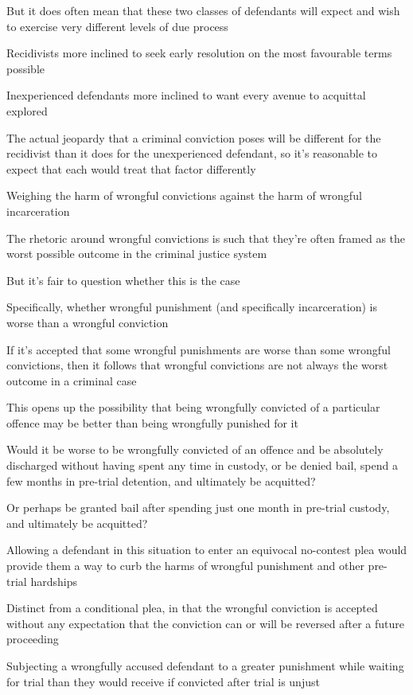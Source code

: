 But it does often mean that these two classes of defendants will expect and wish to exercise very different levels of due process

Recidivists more inclined to seek early resolution on the most favourable terms possible

Inexperienced defendants more inclined to want every avenue to acquittal explored

The actual jeopardy that a criminal conviction poses will be different for the recidivist than it does for the unexperienced defendant, so it's reasonable to expect that each would treat that factor differently

Weighing the harm of wrongful convictions against the harm of wrongful incarceration

The rhetoric around wrongful convictions is such that they're often framed as the worst possible outcome in the criminal justice system

But it's fair to question whether this is the case

Specifically, whether wrongful punishment (and specifically incarceration) is worse than a wrongful conviction

If it's accepted that some wrongful punishments are worse than some wrongful convictions, then it follows that wrongful convictions are not always the worst outcome in a criminal case

This opens up the possibility that being wrongfully convicted of a particular offence may be better than being wrongfully punished for it

Would it be worse to be wrongfully convicted of an offence and be absolutely discharged without having spent any time in custody, or be denied bail, spend a few months in pre-trial detention, and ultimately be acquitted?

Or perhaps be granted bail after spending just one month in pre-trial custody, and ultimately be acquitted?

Allowing a defendant in this situation to enter an equivocal no-contest plea would provide them a way to curb the harms of wrongful punishment and other pre-trial hardships

Distinct from a conditional plea, in that the wrongful conviction is accepted without any expectation that the conviction can or will be reversed after a future proceeding

Subjecting a wrongfully accused defendant to a greater punishment while waiting for trial than they would receive if convicted after trial is unjust


